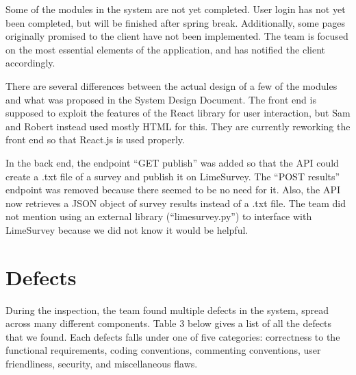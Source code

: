 \documentclass{article}
\begin{document}
Some of the modules in the system are not yet completed. User login has not yet been completed, but will be finished after spring break. Additionally, some pages originally promised to the client have not been implemented. The team is focused on the most essential elements of the application, and has notified the client accordingly. 

There are several differences between the actual design of a few of the modules and what was proposed in the System Design Document. The front end is supposed to exploit the features of the React library for user interaction, but Sam and Robert instead used mostly HTML for this. They are currently reworking the front end so that React.js is used properly.

In the back end, the endpoint ``GET publish'' was added so that the API could create a .txt file of a survey and publish it on LimeSurvey. The ``POST results'' endpoint was removed because there seemed to be no need for it. Also, the API now retrieves a JSON object of survey results instead of a .txt file. The team did not mention using an external library (``limesurvey.py'') to interface with LimeSurvey because we did not know it would be helpful.

\section{Defects}

During the inspection, the team found multiple defects in the system, spread across many different components. Table 3 below gives a list of all the defects that we found. Each defects falls under one of five categories: correctness to the functional requirements, coding conventions, commenting conventions, user friendliness, security, and miscellaneous flaws.
\end{document}
